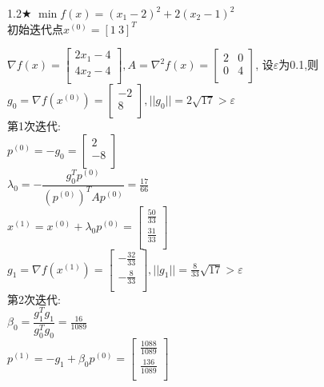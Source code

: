 \begin{problem}{1.2$\bigstar$}
    $\min f(x)=(x_1-2)^2+2(x_2-1)^2$\\
    初始迭代点${x^{(0)}}=[1\ 3]^T$
\end{problem}
\begin{solution}
    $\nabla f(x)=\begin{bmatrix}
        2x_1-4  \\
        4x_2-4  \\
    \end{bmatrix}, A=\nabla^2 f(x)=\begin{bmatrix}
        2  & 0  \\
        0  & 4  \\
    \end{bmatrix}$,
    设$\varepsilon$为0.1,则\\
    $g_0=\nabla f(x^{(0)})=\begin{bmatrix} -2\\8\\\end{bmatrix},||g_0||=2\sqrt{17}>\varepsilon$\\
    第1次迭代:\\
    $p^{(0)}=-g_0=\begin{bmatrix} 2\\-8\\\end{bmatrix}$\\
    $\lambda_0=-\dfrac{g_0^Tp^{(0)}}{(p^{(0)})^TAp^{(0)}}=\frac{17}{66}$\\
    $x^{(1)}=x^{(0)}+\lambda_0p^{(0)}=\begin{bmatrix} \frac{50}{33}\\\frac{31}{33}\\\end{bmatrix}$\\
    $g_1=\nabla f(x^{(1)})=\begin{bmatrix} -\frac{32}{33}\\-\frac{8}{33}\\\end{bmatrix},||g_1||=\frac{8}{33}\sqrt{17}>\varepsilon$\\
    第2次迭代:\\
    $\beta_0=\dfrac{g_1^Tg_1}{g_0^Tg_0}=\frac{16}{1089}$\\
    $p^{(1)}=-g_1+\beta_0p^{(0)}=\begin{bmatrix} \frac{1088}{1089}\\\frac{136}{1089}\\\end{bmatrix}$\\

\end{solution}

